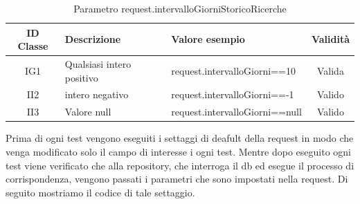 \begin{table}[H]
	\centering
	\begin{tabular}{|c|p{4cm}|p{5.5cm}|c|} 
		\hline
		\textbf{ID Classe} & \textbf{Descrizione} & \textbf{Valore esempio} & \textbf{Validità} \\
		\hline
		IG1 & Qualsiasi intero positivo & request.intervalloGiorni==10 & Valida \\
		\hline
		II2 & intero negativo & request.intervalloGiorni==-1 & Valido \\
		\hline
		II3 & Valore null & request.intervalloGiorni==null & Valido \\
		\hline
	\end{tabular}
	\caption{Parametro request.intervalloGiorniStoricoRicerche}
	\label{tab:placeholder}
\end{table}

\vspace{1cm}




Prima di ogni test vengono eseguiti i settaggi di deafult della request in modo che venga modificato solo il campo di interesse i ogni test.
Mentre dopo eseguito ogni test viene verificato che alla repository, che interroga il db ed esegue il processo di corrispondenza, vengono passati i parametri che sono impostati nella request. Di seguito mostriamo il codice di tale settaggio.


